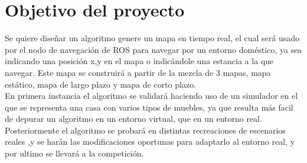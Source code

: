 
\section{Objetivo del proyecto}
\label{sec:objetivos}

Se quiere diseñar un algoritmo genere un mapa en tiempo real, el cual será usado por el nodo de navegación de ROS para navegar por un entorno doméstico, ya sea indicando una posición x,y en el mapa o indicándole una estancia a la que navegar. Este mapa se construirá a partir de la mezcla de 3 mapas, mapa estático, mapa de largo plazo y mapa de corto plazo.\\
En primera instancia el algoritmo se validará haciendo uso de un simulador en el que se representa una casa con varios tipos de muebles, ya que resulta más facil de depurar un algoritmo en un entorno virtual, que en un entorno real. Posteriormente el algoritmo se probará en distintas recreaciones de escenarios reales ,y se harán las modificaciones oportunas para adaptarlo al entorno real, y por ultimo se llevará a la competición.\\

